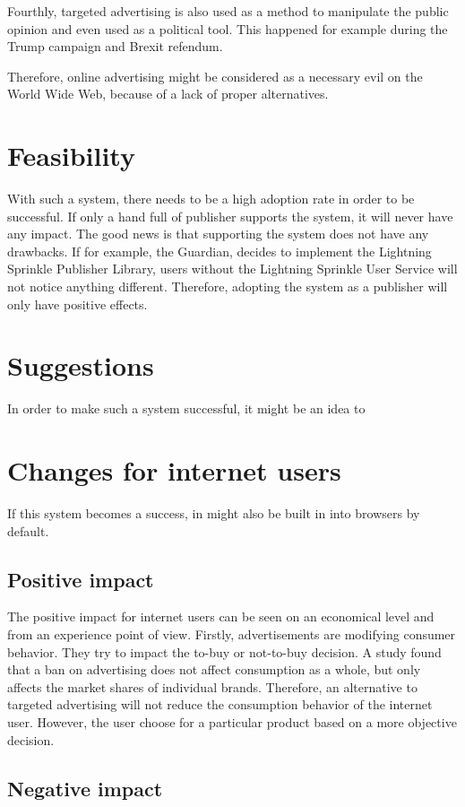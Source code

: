 Fourthly, targeted advertising is also used as a method to manipulate the public opinion and even used as a political tool. This happened for example during the Trump campaign and Brexit refendum\cite{cadwalladr2018cambridge}.

Therefore, online advertising might be considered as a necessary evil on the World Wide Web, because of a lack of proper alternatives.

\section{Feasibility}
With such a system, there needs to be a high adoption rate in order to be successful. If only a hand full of publisher supports the system, it will never have any impact. The good news is that supporting the system does not have any drawbacks. If for example, the Guardian, decides to implement the Lightning Sprinkle Publisher Library, users without the Lightning Sprinkle User Service will not notice anything different. Therefore, adopting the system as a publisher will only have positive effects.



\section{Suggestions}
In order to make such a system successful, it might be an idea to 


\section{Changes for internet users}
If this system becomes a success, in might also be built in into browsers by default. 

\subsection{Positive impact}
The positive impact for internet users can be seen on an economical level and from an experience point of view. Firstly, advertisements are modifying consumer behavior. They try to impact the to-buy or not-to-buy decision\cite{johnson2007consumer}. A study found that a ban on advertising does not affect consumption as a whole, but only affects the market shares of individual brands\cite{advertisementsconsumption}. Therefore, an alternative to targeted advertising will not reduce the consumption behavior of the internet user. However, the user choose for a particular product based on a more objective decision.

\subsection{Negative impact}

